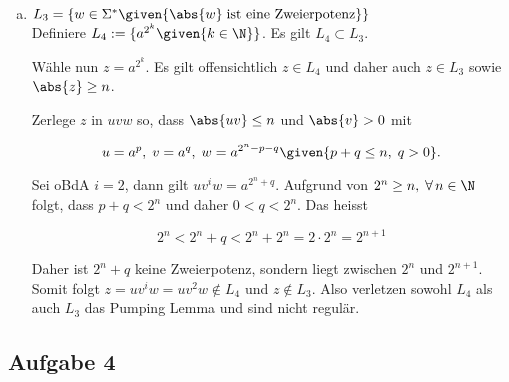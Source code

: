 \begin{enumerate}[a)]
  \item $ L_3 = \{  w \in \Sigma^{*} \given{ \abs{w} \; \text{ist eine Zweierpotenz} }  \} $ \\

  Definiere $L_4 := \{  a^{2^{k}} \given{k \in \N}  \}$. Es gilt $L_4 \subset L_3$.

  Wähle nun $z = a^{2^{k}}$. Es gilt offensichtlich $z \in L_4$ und daher auch $z \in L_3$ sowie $\abs{z} \geq n$.

  Zerlege $z$ in $uvw$ so, dass $\abs{uv} \leq n$ und $\abs{v} > 0$ mit

  \[  u = a^p, \; v = a^q, \; w = a^{2^{n} - p -q} \given{p+q \leq n, \; q > 0} . \]

  Sei oBdA $i=2$, dann gilt $uv^{i}w = a^{2^{n} + q}$. Aufgrund von $2^n \geq n, \; \forall \, n \in \N$ folgt, dass $p+q < 2^n$ und daher $0 < q < 2^n$. Das heisst

  \[  2^n < 2^n + q < 2^n + 2^n = 2 \cdot 2^n = 2^{n+1}  \]

  Daher ist $2^n + q$ keine Zweierpotenz, sondern liegt zwischen $2^n$ und $2^{n+1}$. Somit folgt $z = uv^{i}w = uv^{2}w \notin L_4$ und $z \notin L_3$. Also verletzen sowohl $L_4$ als auch $L_3$ das Pumping Lemma und sind nicht regulär.
  \end{enumerate}


\subsection*{Aufgabe 4}

